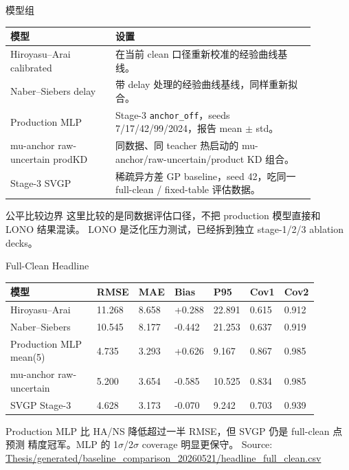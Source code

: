 \documentclass[aspectratio=169,11pt]{beamer}
\newcommand{\good}[1]{\textcolor{goodGreen}{#1}}
\newcommand{\blue}[1]{\textcolor{aaltoBlue}{#1}}
\newcommand{\src}[1]{\vfill{\tiny\textcolor{gray!70!black}{Source: \url{#1}}}}
\begin{document}
\begin{frame}{模型组}
\small
\begin{tabular}{L{0.30\linewidth}L{0.58\linewidth}}
\toprule
模型 & 设置 \\
\midrule
Hiroyasu--Arai calibrated & 在当前 clean 口径重新校准的经验曲线基线。 \\
Naber--Siebers delay & 带 delay 处理的经验曲线基线，同样重新拟合。 \\
Production MLP & Stage-3 \texttt{anchor\_off}，seeds 7/17/42/99/2024，报告 mean \(\pm\) std。 \\
mu-anchor raw-uncertain prodKD & 同数据、同 teacher 热启动的 mu-anchor/raw-uncertain/product KD 组合。 \\
Stage-3 SVGP & 稀疏异方差 GP baseline，seed 42，吃同一 full-clean / fixed-table 评估数据。 \\
\bottomrule
\end{tabular}

\vspace{0.7em}
\begin{block}{公平比较边界}
\footnotesize
这里比较的是同数据评估口径，不把 production 模型直接和 LONO 结果混读。
LONO 是泛化压力测试，已经拆到独立 stage-1/2/3 ablation decks。
\end{block}
\end{frame}

\begin{frame}{Full-Clean Headline}
\scriptsize
\begin{tabular}{L{0.29\linewidth}R{0.10\linewidth}R{0.10\linewidth}R{0.10\linewidth}R{0.10\linewidth}R{0.10\linewidth}R{0.10\linewidth}}
\toprule
模型 & RMSE & MAE & Bias & P95 & Cov1 & Cov2 \\
\midrule
Hiroyasu--Arai & 11.268 & 8.658 & +0.288 & 22.891 & 0.615 & 0.912 \\
Naber--Siebers & 10.545 & 8.177 & -0.442 & 21.253 & 0.637 & 0.919 \\
\good{Production MLP mean(5)} & \good{4.735} & \good{3.293} & +0.626 & \good{9.167} & \good{0.867} & \good{0.985} \\
mu-anchor raw-uncertain & 5.200 & 3.654 & -0.585 & 10.525 & 0.834 & 0.985 \\
\blue{SVGP Stage-3} & \blue{4.628} & \blue{3.173} & -0.070 & 9.242 & 0.703 & 0.939 \\
\bottomrule
\end{tabular}

\vspace{0.6em}
\small
Production MLP 比 HA/NS 降低超过一半 RMSE，但 SVGP 仍是 full-clean 点预测
精度冠军。MLP 的 1\(\sigma\)/2\(\sigma\) coverage 明显更保守。
\src{Thesis/generated/baseline_comparison_20260521/headline_full_clean.csv}
\end{frame}
\end{document}
